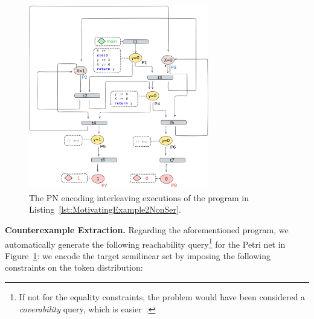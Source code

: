 %


\begin{figure}[!htbp]
	\centering
	\includegraphics[width=0.7\textwidth]{plots/code_2_PN_with_annotation.png}
	\caption{The PN encoding interleaving executions of the program in Listing~\ref{lst:MotivatingExample2NonSer}.}
	\label{fig:code2ExamplePN}
\end{figure}

\medskip
\noindent
\textbf{Counterexample Extraction.}
%
Regarding the aforementioned program, we automatically generate the following reachability query\footnote{If not for the equality constraints, the problem would have been considered a \textit{coverability} query, which is easier~\cite{Ra78}.} for the Petri net in Figure~\ref{fig:code2ExamplePN}: we encode the target semilinear set by imposing the following constraints on the token distribution:

